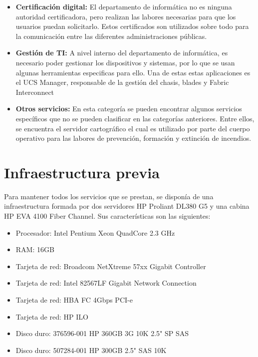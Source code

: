 \documentclass[12pt,a4paper,titlepage,twoside]{report}
\begin{document}
\begin{itemize}
\item \textbf{Certificación digital:} El departamento de informática no es ninguna autoridad certificadora, pero realizan las labores necesarias para que los usuarios puedan solicitarlo. Estos certificados son utilizados sobre todo para la comunicación entre las diferentes administraciones públicas.
\item \textbf{Gestión de TI:} A nivel interno del departamento de informática, es necesario poder gestionar los dispositivos y sistemas, por lo que se usan algunas herramientas especificas para ello. Una de estas estas aplicaciones es el UCS Manager, responsable de la gestión del chasis, blades y Fabric Interconnect
\item \textbf{Otros servicios:} En esta categoría se pueden encontrar algunos servicios específicos que no se pueden clasificar en las categorías anteriores. Entre ellos, se encuentra el servidor cartográfico el cual es utilizado por parte del cuerpo operativo para las labores de prevención, formación y extinción de incendios. 
\end{itemize}

\section{Infraestructura previa}
Para mantener todos los servicios que se prestan, se disponía de una infraestructura formada por dos servidores HP Proliant DL380 G5 y una cabina HP EVA 4100 Fiber Channel. Sus características son las siguientes:
\begin{itemize}
    \item Procesador: Intel Pentium Xeon QuadCore 2.3 GHz
    \item RAM: 16GB
    \item Tarjeta de red: Broadcom NetXtreme 57xx Gigabit Controller
    \item Tarjeta de red: Intel 82567LF Gigabit Network Connection
    \item Tarjeta de red: HBA FC 4Gbps PCI-e
    \item Tarjeta de red: HP ILO
    \item Disco duro: 376596-001 HP 360GB 3G 10K 2.5" SP SAS
    \item Disco duro: 507284-001 HP 300GB 2.5" SAS 10K
\end{itemize}
\end{document}
